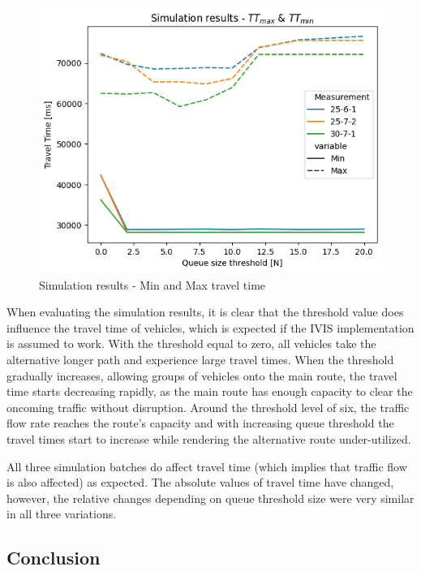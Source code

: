 \documentclass[0main.tex]{subfiles}
\begin{document}
\begin{figure}[htbp]
    \centering
    \includegraphics[width=.8\textwidth]{MinMax.png}
    \caption{Simulation results - Min and Max travel time}
    \label{fig-sim-minmax}
\end{figure}

When evaluating the simulation results, it is clear that the threshold value does influence the
travel time of vehicles, which is expected if the IVIS implementation is assumed to work. With
the threshold equal to zero, all vehicles take the alternative longer path and experience large
travel times. When the threshold gradually increases, allowing groups of vehicles onto the 
main route, the travel time starts decreasing rapidly, as the main route has enough capacity to clear 
the oncoming traffic without disruption. Around the threshold level of six, the traffic flow 
rate reaches the route's capacity and with increasing queue threshold the travel times start to
increase while rendering the alternative route under-utilized.

All three simulation batches do affect travel time (which implies that traffic flow 
is also affected) as expected. The absolute values of travel time have changed, however, 
the relative changes depending on queue threshold size were very similar in all three 
variations.

\subsection{Conclusion}
\end{document}
